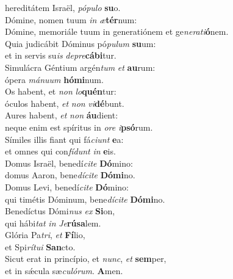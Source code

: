 \evenverse hereditátem Israël, \textit{pó}\textit{pu}\textit{lo} \textbf{su}o.\\
\oddverse Dómine, nomen tuum \textit{in} \textit{æ}\textbf{tér}num:~\*\\
\oddverse Dómine, memoriále tuum in generatiónem et ge\textit{ne}\textit{ra}\textit{ti}\textbf{ó}nem.\\
\evenverse Quia judicábit Dóminus pó\textit{pu}\textit{lum} \textbf{su}um:~\*\\
\evenverse et in servis su\textit{is} \textit{de}\textit{pre}\textbf{cá}\textbf{bi}tur.\\
\oddverse Simulácra Géntium argén\textit{tum} \textit{et} \textbf{au}rum:~\*\\
\oddverse ópera \textit{má}\textit{nu}\textit{um} \textbf{hó}\textbf{mi}num.\\
\evenverse Os habent, et \textit{non} \textit{lo}\textbf{quén}tur:~\*\\
\evenverse óculos habent, \textit{et} \textit{non} \textit{vi}\textbf{dé}bunt.\\
\oddverse Aures habent, \textit{et} \textit{non} \textbf{áu}dient:~\*\\
\oddverse neque enim est spíritus in \textit{o}\textit{re} \textit{i}\textbf{psó}rum.\\
\evenverse Símiles illis fiant qui fá\textit{ci}\textit{unt} \textbf{e}a:~\*\\
\evenverse et omnes qui con\textit{fí}\textit{dunt} \textit{in} \textbf{e}is.\\
\oddverse Domus Israël, benedí\textit{ci}\textit{te} \textbf{Dó}mino:~\*\\
\oddverse domus Aaron, bene\textit{dí}\textit{ci}\textit{te} \textbf{Dó}\textbf{mi}no.\\
\evenverse Domus Levi, benedí\textit{ci}\textit{te} \textbf{Dó}mino:~\*\\
\evenverse qui timétis Dóminum, bene\textit{dí}\textit{ci}\textit{te} \textbf{Dó}\textbf{mi}no.\\
\oddverse Benedíctus Dómi\textit{nus} \textit{ex} \textbf{Si}on,~\*\\
\oddverse qui hábi\textit{tat} \textit{in} \textit{Je}\textbf{rú}\textbf{sa}lem.\\
\evenverse Glória Pa\textit{tri}, \textit{et} \textbf{Fí}lio,~\*\\
\evenverse et Spi\textit{rí}\textit{tu}\textit{i} \textbf{San}cto.\\
\oddverse Sicut erat in princípio, et \textit{nunc}, \textit{et} \textbf{sem}per,~\*\\
\oddverse et in sǽcula sæ\textit{cu}\textit{ló}\textit{rum}. \textbf{A}men.\\
